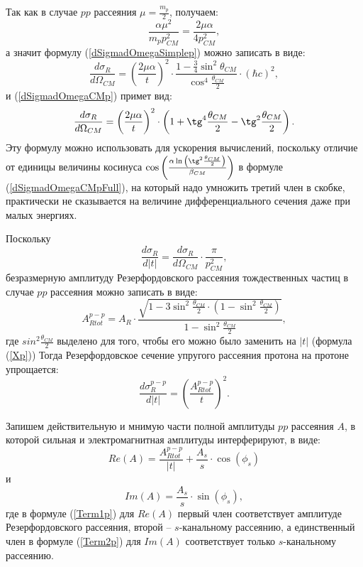 \documentclass[a4paper,12pt]{article}
\begin{document}
\begin{large}
Так как в случае $pp$ рассеяния $\mu=\frac{m_p}{2}$, получаем:
\begin{equation}
  \label{EqualCoeffficientsp}
\frac{\alpha\mu^2}{m_p p_{CM}^2}=\frac{2 \mu \alpha }{4p_{CM}^2},
\end{equation}
а значит формулу (\ref{dSigmadOmegaSimplep}) можно записать в виде:
\begin{equation}
  \label{dSigmadOmegaSimple1p}
\frac{d\sigma_R}{d\Omega_{CM}}=\left( \frac{2 \mu \alpha}{t}\right)^2 \cdot \frac{1-\frac{3}{4} \sin^2{\theta_{CM}}}{\cos^4{\frac{\theta_{CM}}{2}}} \cdot \left( \hbar c \right)^2,
\end{equation}
и (\ref{dSigmadOmegaCMp}) примет вид:
\begin{equation}
  \label{dSigmadOmegaCM1p}
  \frac{d\sigma_R}{d\Omega_{CM}}=\left( \frac{2 \mu \alpha}{t} \right)^2 \cdot \left( 1 + \tg^4{\frac{\theta_{CM}}{2}} -\tg^2{\frac{\theta_{CM}}{2}} \right).
\end{equation}
Эту формулу можно использовать для ускорения вычислений, поскольку отличие от единицы величины косинуса $\cos{\left( \frac{\alpha\ln{ \left( \tg^2{\frac{\theta_{CM}}{2}} \right)}}{\beta_{CM}}\right)}$ в формуле (\ref{dSigmadOmegaCMpFull}), на который надо умножить третий член в скобке, практически не сказывается на величине дифференциального сечения даже при малых энергиях.

Поскольку
\begin{equation}
  \label{dSigmadOmegaCM2p}
  \frac{d\sigma_R}{d|t|}=\frac{d\sigma_R}{d\Omega_{CM}} \cdot \frac{\pi}{p_{CM}^2},
\end{equation}
безразмерную амплитуду Резерфордовского рассеяния тождественных частиц в случае $pp$ рассеяния можно записать в виде:
\begin{equation}
  \label{Artotp}
  A_{Rtot}^{p-p}=A_R \cdot \frac{\sqrt{1-3 \sin^2{\frac{\theta_{CM}}{2}} \cdot \left( 1-\sin^2{\frac{\theta_{CM}}{2}} \right) }}{1-\sin^2{\frac{\theta_{CM}}{2}}},
\end{equation}
где $sin^2{\frac{\theta_{CM}}{2}}$ выделено для того, чтобы его можно было заменить на $|t|$ (формула (\ref{Xp}))
  Тогда Резерфордовское сечение упругого рассеяния протона на протоне упрощается:
\begin{equation}
  \label{dSigmadTp}
  \frac{d\sigma_R^{p-p}}{d|t|}=\left( \frac{A_{Rtot}^{p-p}}{t} \right)^2.
\end{equation}

Запишем действительную и мнимую части полной амплитуды $pp$ рассеяния $A$, в которой сильная и электромагнитная амплитуды интерферируют, в виде: 
\begin{equation}
  \label{Term1p}
  Re(A)=\frac{A_{Rtot}^{p-p}}{|t|}+\frac{A_s}{s} \cdot \cos(\phi_s)
\end{equation}
и
\begin{equation}
  \label{Term2p}
  Im(A)=\frac{A_s}{s} \cdot \sin(\phi_s),
\end{equation}
где в формуле (\ref{Term1p}) для $Re(A)$ первый член соответствует амплитуде Резерфордовского рассеяния, второй -- $s$-канальному рассеянию,
а единственный член в формуле (\ref{Term2p}) для $Im(A)$ соответствует только $s$-канальному рассеянию.


\end{large}
\end{document}
